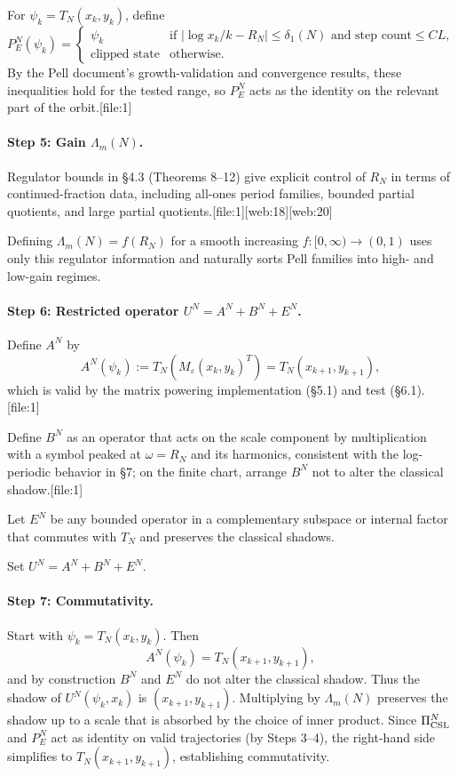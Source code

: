 \documentclass[11pt]{article}
\begin{document}
For \(\psi_k = T_N(x_k,y_k)\), define
\[
P_E^N(\psi_k) =
\begin{cases}
\psi_k & \text{if } |\log x_k/k - R_N| \le \delta_1(N)
         \text{ and step count} \le C L,\\
\text{clipped state} & \text{otherwise}.
\end{cases}
\]
By the Pell document's growth-validation and convergence results, these
inequalities hold for the tested range, so \(P_E^N\) acts as the
identity on the relevant part of the orbit.[file:1]

\paragraph{Step 5: Gain \(\Lambda_m(N)\).}
Regulator bounds in §4.3 (Theorems 8–12) give explicit control of
\(R_N\) in terms of continued-fraction data, including all-ones period
families, bounded partial quotients, and large partial quotients.[file:1][web:18][web:20]

Defining \(\Lambda_m(N) = f(R_N)\) for a smooth increasing
\(f:[0,\infty)\to(0,1)\) uses only this regulator information and
naturally sorts Pell families into high- and low-gain regimes.

\paragraph{Step 6: Restricted operator \(U^N = A^N + B^N + E^N\).}
Define \(A^N\) by
\[
A^N(\psi_k) := T_N(M_\varepsilon (x_k,y_k)^T) = T_N(x_{k+1},y_{k+1}),
\]
which is valid by the matrix powering implementation (§5.1) and test
(§6.1).[file:1]

Define \(B^N\) as an operator that acts on the scale component by
multiplication with a symbol peaked at \(\omega = R_N\) and its
harmonics, consistent with the log-periodic behavior in §7; on the
finite chart, arrange \(B^N\) not to alter the classical shadow.[file:1]

Let \(E^N\) be any bounded operator in a complementary subspace or
internal factor that commutes with \(T_N\) and preserves the classical
shadows.

Set \(U^N = A^N + B^N + E^N\).

\paragraph{Step 7: Commutativity.}
Start with \(\psi_k = T_N(x_k,y_k)\). Then
\[
A^N(\psi_k) = T_N(x_{k+1},y_{k+1}),
\]
and by construction \(B^N\) and \(E^N\) do not alter the classical
shadow. Thus the shadow of \(U^N(\psi_k,x_k)\) is \((x_{k+1},y_{k+1})\).
Multiplying by \(\Lambda_m(N)\) preserves the shadow up to a scale that
is absorbed by the choice of inner product.
Since \(\Pi_{\rm CSL}^N\) and \(P_E^N\) act as identity on valid
trajectories (by Steps 3–4), the right-hand side simplifies to
\(T_N(x_{k+1},y_{k+1})\), establishing commutativity.
\end{document}
